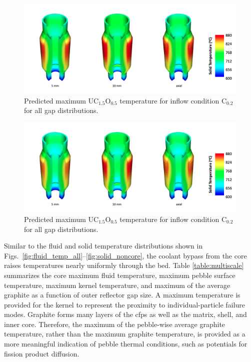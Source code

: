 \begin{figure}[h!]
\centering
\includegraphics[height=0.4\linewidth]{figs/max_uo2.png}
\caption{Predicted maximum UC$_{1.5}$O$_{0.5}$ temperature for inflow condition C$_\text{0.2}$ for all gap distributions.}
\label{fig:uo2_max}
\end{figure}

\begin{figure}[h!]
\centering
\includegraphics[height=0.4\linewidth]{figs/avg_uo2.png}
\caption{Predicted maximum UC$_{1.5}$O$_{0.5}$ temperature for inflow condition C$_\text{0.2}$ for all gap distributions.}
\label{fig:uo2_avg}
\end{figure}

Similar to the fluid and solid temperature distributions shown in Figs.\ \ref{fig:fluid_temp_all}--\ref{fig:solid_noncore}, the coolant bypass from the core raises temperatures nearly uniformly through the bed. Table \ref{table:multiscale} summarizes the core maximum fluid temperature, maximum pebble surface temperature, maximum kernel temperature, and maximum of the average graphite as a function of outer reflector gap size. A maximum temperature is provided for the kernel to represent the proximity to individual-particle failure modes. Graphite forms many layers of the \glspl{cfp} as well as the matrix, shell, and inner core. Therefore, the maximum of the pebble-wise average graphite temperature, rather than the maximum graphite temperature, is provided as a more meaningful indication of pebble thermal conditions, such as potentials for fission product diffusion.

